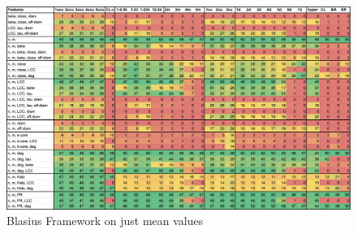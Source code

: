 \begin{figure}
    \centering
    \includegraphics[width=\textwidth]{./figures/blasius_framework_means.png}
    \caption{Blasius Framework on just mean values}
    \label{fig:blasius_framework_means}
\end{figure}